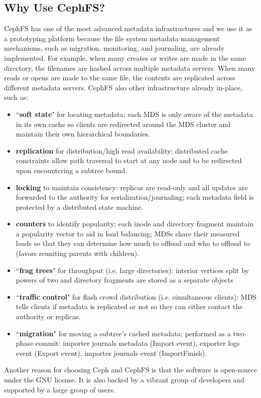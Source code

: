 \subsection*{Why Use CephFS?}
\label{background-why}

CephFS has one of the most advanced metadata infrastructures and we use it as a
prototyping platform because the file system metadata management mechanisms,
such as migration, monitoring, and journaling, are already implemented.  For
example, when many creates or writes are made in the same directory, the
filenames are hashed across multiple metadata servers. When many reads or opens
are made to the same file, the contents are replicated across different
metadata servers. CephFS also other infrastructure already in-place, such as: 

\begin{itemize}

\item ``\textbf{soft state}" for locating metadata: each MDS is only aware of
the metadata in its own cache so clients are redirected around the MDS cluster and
maintain their own hierarchical boundaries.

\item \textbf{replication} for distribution/high read availability: distributed
cache constraints allow path traversal to start at any node and to be
redirected upon encountering a subtree bound.

\item \textbf{locking} to maintain consistency: replicas are read-only and all
updates are forwarded to the authority for serialization/journaling; each
metadata field is protected by a distributed state machine.

\item \textbf{counters} to identify popularity: each inode and directory
fragment maintain a popularity vector to aid in load balancing; MDSs share
their measured loads so that they can determine how much to offload and who
to offload to (favors reuniting parents with children). 

\item ``\textbf{frag trees}" for throughput (i.e. large directories): interior
vertices split by powers of two and directory fragments are stored as a
separate objects

\item ``\textbf{traffic control}" for flash crowd distribution (i.e.
simultaneous clients): MDS tells clients if metadata is replicated or not so
they can either contact the authority or replicas.

\item ``\textbf{migration}" for moving a subtree's cached metadata; performed
as a two-phase commit: importer journals metadata (Import event), exporter logs
event (Export event), importer journals event (ImportFinish). 

\end{itemize}

Another reason for choosing Ceph and CephFS is that the software is open-source
under the GNU license. It is also backed by a vibrant group of developers and
supported by a large group of users.
